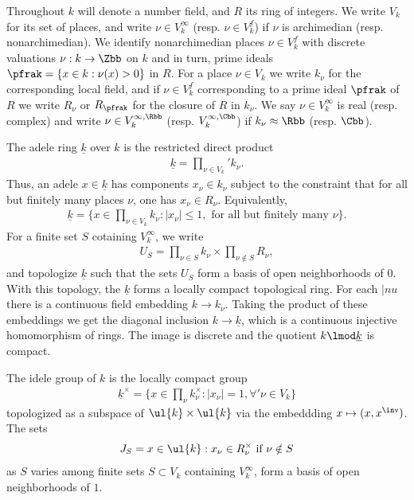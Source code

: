 Throughout $k$ will denote a number field, and $R$ its ring of integers. We write $V_k$ for its set of places, and write $\nu \in V_k^\infty$ (resp. $\nu \in V_k^f$) if $\nu$ is archimedian (resp. nonarchimedian).
We identify nonarchimedian places $\nu \in V_k^f$ with discrete valuations $\nu : k \to \Zbb$ on $k$ and in turn, prime ideals $\pfrak = \{ x \in k: \nu(x) > 0\}$ in $R$.
For a place $\nu \in V_k$ we write $k_\nu$ for the corresponding local field, and if $\nu \in V_k^f$ corresponding to a prime ideal $\pfrak$ of $R$ we write $R_\nu$ or $R_\pfrak$ for the closure of $R$ in $k_\nu$.
We say $\nu \in V_k^\infty$ is real (resp. complex) and write $\nu \in V_k^{\infty,\Rbb}$ (resp. $V_k^{\infty,\Cbb}$) if $k_\nu \approx \Rbb$ (resp. $\Cbb$).

The adele ring $\underline{k}$ over $k$ is the restricted direct product
\begin{align}
    \underline{k} = \prod_{\nu \in V_k}' k_\nu.
\end{align}
Thus, an adele $x \in \underline{k}$ has components $x_\nu \in k_\nu$ subject to the constraint that for all but finitely many places $\nu$, one has  $x_\nu \in R_\nu$. Equivalently,
\begin{align}
    \underline{k} = \{x \in \prod_{\nu\in V_k} k_\nu : |x_\nu| \leq 1, \text{ for all but finitely many $\nu$}\}.
\end{align}
For a finite set $S$ cotaining $V_k^\infty$, we write
\begin{align}
    U_S = \prod_{\nu \in S}k_\nu \times \prod_{\nu \notin S}R_\nu,
\end{align}
and topologize $\underline{k}$ such that the sets $U_S$ form a basis of open neighborhoods of $0$. With this topology, the $\underline{k}$ forms a locally compact topological ring. For each $|nu$ there is a continuous field embedding $k \to k_\nu$. Taking the product of these embeddings we get the diagonal inclusion $k \to \underline{k}$, which is a continuous injective homomorphism of rings. The image is discrete and the quotient $k \lmod \underline{k}$ is compact.

The idele group of $k$ is the locally compact group
\begin{align}
    \underline{k}^\times = \{ x \in \prod_\nu k_\nu^\times : |x_\nu| =1, \forall' \nu \in V_k
    \}
\end{align}
topologized as a subspace of $\ul{k} \times \ul{k}$ via the embeddding $x \mapsto (x,x^\inv)$. The sets
\begin{align*}
    J_S = {x \in \ul{k}: x_\nu \in R_\nu^\times \text{ if $\nu \notin S$} }
\end{align*}
as $S$ varies among finite sets $S \subset V_k$ containing $V_k^\infty$, form a basis of open neighborhoods of $1$.

